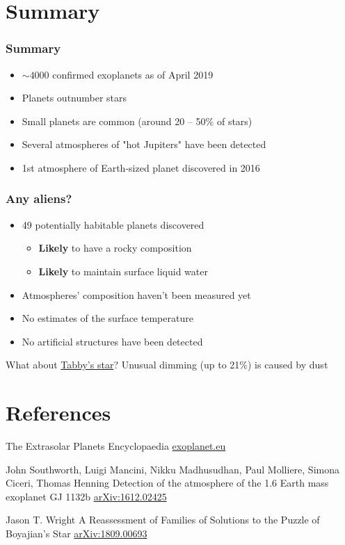 \documentclass[aspectratio=169]{beamer}
\begin{document}
\section{Summary}
\begin{frame}
\frametitle{Summary}
\begin{itemize}
\item $\sim 4000$ confirmed exoplanets as of April 2019
\item Planets outnumber stars
\item Small planets are common (around 20 -- 50\% of stars)
\item Several atmospheres of "hot Jupiters" have been detected
\item 1st atmosphere of Earth-sized planet discovered in 2016 \cite{arXiv:1612.02425}
\end{itemize}
\end{frame}

\begin{frame}
\frametitle{Any aliens?}
\begin{itemize}
\item 49 potentially habitable planets discovered
\begin{itemize}
\item {\bf Likely} to have a rocky composition
\item {\bf Likely} to maintain surface liquid water
\end{itemize}
\item Atmospheres' composition haven't been measured yet
\item No estimates of the surface temperature
\item No artificial structures have been detected
\end{itemize}
\begin{block}{What about \href{http://en.wikipedia.org/wiki/KIC_8462852}{Tabby's star}?}
Unusual dimming (up to 21\%) is caused by dust \cite{arXiv:1809.00693}
\end{block}
\end{frame}

\section{References}
\begin{frame}[allowframebreaks]
\footnotesize{


\begin{thebibliography}{99}

The Extrasolar Planets Encyclopaedia
\newblock \href{http://exoplanet.eu}{exoplanet.eu}

John Southworth, Luigi Mancini, Nikku Madhusudhan, Paul Molliere, Simona Ciceri, Thomas Henning
\newblock Detection of the atmosphere of the 1.6 Earth mass exoplanet GJ 1132b
\newblock \href{http://arxiv.org/abs/1612.02425}{arXiv:1612.02425}

Jason T. Wright
\newblock A Reassessment of Families of Solutions to the Puzzle of Boyajian's Star
\newblock \href{https://arxiv.org/abs/1809.00693}{arXiv:1809.00693}
\end{thebibliography}
}
\end{frame}
\end{document}
